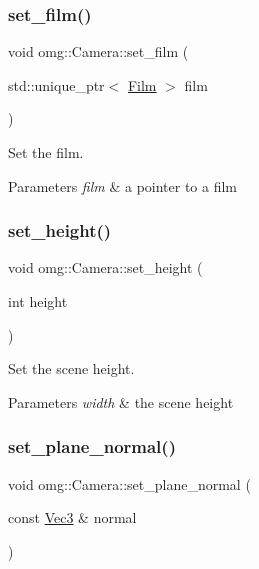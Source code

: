 \subsubsection{\texorpdfstring{set\_film()}{set\_film()}}
{\footnotesize\ttfamily void omg\+::\+Camera\+::set\+\_\+film (\begin{DoxyParamCaption}\item[{std\+::unique\+\_\+ptr$<$ \mbox{\hyperlink{classomg_1_1_film}{Film}} $>$}]{film }\end{DoxyParamCaption})\hspace{0.3cm}{\ttfamily [inline]}}



Set the film. 


\begin{DoxyParams}{Parameters}
{\em film} & a pointer to a film \\
\hline
\end{DoxyParams}
\mbox{\label{classomg_1_1_camera_a75d3baca3bae25365e5d3dddc005676e}} 
\subsubsection{\texorpdfstring{set\_height()}{set\_height()}}
{\footnotesize\ttfamily void omg\+::\+Camera\+::set\+\_\+height (\begin{DoxyParamCaption}\item[{int}]{height }\end{DoxyParamCaption})\hspace{0.3cm}{\ttfamily [inline]}}



Set the scene height. 


\begin{DoxyParams}{Parameters}
{\em width} & the scene height \\
\hline
\end{DoxyParams}
\mbox{\label{classomg_1_1_camera_a5983a689364dd5c9701e157b4620c2cd}} 
\subsubsection{\texorpdfstring{set\_plane\_normal()}{set\_plane\_normal()}}
{\footnotesize\ttfamily void omg\+::\+Camera\+::set\+\_\+plane\+\_\+normal (\begin{DoxyParamCaption}\item[{const \mbox{\hyperlink{namespaceomg_a45a9482677fee9933ff369b49894e316}{Vec3}} \&}]{normal }\end{DoxyParamCaption})\hspace{0.3cm}{\ttfamily [inline]}}



